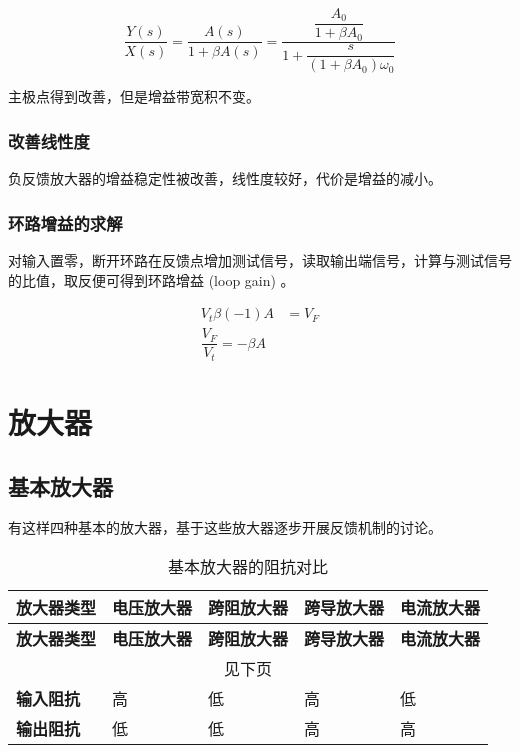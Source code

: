 \documentclass[cn,11pt,chinese,black,simple]{../elegantbook}
\begin{document}
\[\dfrac{Y(s)}{X(s)} = \dfrac{A(s)}{1 + \beta A(s)} = \dfrac{\dfrac{A_0}{1 + \beta A_0}}{1 + \dfrac{s}{(1+\beta A_0)\omega_0}}\] 

主极点得到改善，但是增益带宽积不变。

\subsubsection{改善线性度}

负反馈放大器的增益稳定性被改善，线性度较好，代价是增益的减小。

\subsubsection{环路增益的求解}

对输入置零，断开环路在反馈点增加测试信号，读取输出端信号，计算与测试信号的比值，取反便可得到环路增益 (loop gain) 。


\[\begin{aligned}
    V_t \beta (-1) A &= V_F \\
    \dfrac{V_F}{V_t} = -\beta A
\end{aligned}\]

\section{放大器}

\subsection{基本放大器}

有这样四种基本的放大器，基于这些放大器逐步开展反馈机制的讨论。



\begin{longtable}{lllll}
    \caption{基本放大器的阻抗对比} \\
    \toprule \textbf{放大器类型} & \textbf{电压放大器} & \textbf{跨阻放大器} & \textbf{跨导放大器} & \textbf{电流放大器} \\
    \midrule
    \endfirsthead
    
    \toprule \textbf{放大器类型} & \textbf{电压放大器} & \textbf{跨阻放大器} & \textbf{跨导放大器} & \textbf{电流放大器} \\
    \midrule
    \endhead

    \hline
    \multicolumn{5}{c}{见下页}\\   
    \bottomrule
    \endfoot

    \bottomrule
    \endlastfoot

    \textbf{输入阻抗}  & 高              & 低              & 高              & 低              \\
    \textbf{输出阻抗}  & 低              & 低              & 高              & 高              \\
    
\end{longtable}
\end{document}
